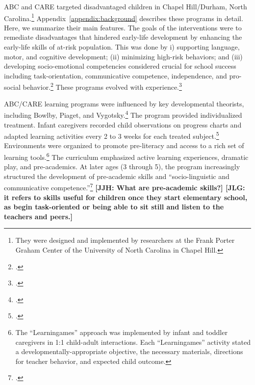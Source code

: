 ABC and CARE targeted disadvantaged children in Chapel Hill/Durham, North Carolina.\footnote{They were designed and implemented by researchers at the Frank Porter Graham Center of the University of North Carolina in Chapel Hill.} Appendix~\ref{appendix:background} describes these programs in detail. Here, we summarize their main features. The goals of the interventions were to remediate disadvantages that hindered early-life development by enhancing the early-life skills of at-risk population. This was done by i) supporting language, motor, and cognitive development; (ii) minimizing high-risk behaviors; and (iii) developing socio-emotional competencies considered crucial for school success including task-orientation, communicative competence, independence, and pro-social behavior.\footnote{\citet{Ramey_Collier_etal_1976_CarolinaAbecedarianProject, Ramey_etal_1985_Project-CARE_TiECSE, Sparling_1974_Synth_Edu_Infant_SPEECH, Wasik_Ramey_etal_1990_CD, Ramey-etal_2012-ABC}.} These programs evolved with experience.\footnote{ \citet{Ramey-etal_1975_AJoMD, Finkelstein_1982_Day_Care_YC, McGinness_1982_Language-Poverty-Child,Haskins_1985_CD}.}

ABC/CARE learning programs were influenced by key developmental theorists, including Bowlby, Piaget, and Vygotsky.\footnote{\citet{Sparling_1974_Synth_Edu_Infant_SPEECH,Mcginness_1981_Developing,abc2014-2015interviews}.} The program provided individualized treatment. Infant caregivers recorded child observations on progress charts and adapted learning activities every 2 to 3 weeks for each treated subject.\footnote{\citet{Ramey_Collier_etal_1976_CarolinaAbecedarianProject,Campbell_Ramey_1994_CD}.} Environments were organized to promote pre-literacy and access to a rich set of learning tools.\footnote{The ``Learningames'' approach was implemented by infant and toddler caregivers in 1:1 child-adult interactions. Each ``Learningames'' activity stated a developmentally-appropriate objective, the necessary materials, directions for teacher behavior, and expected child outcome.} The curriculum emphasized active learning experiences, dramatic play, and pre-academics. At later ages (3 through 5), the program increasingly structured the development of pre-academic skills and ``socio-linguistic and communicative competence.''\footnote{\citet{Ramey-et-al_1977_Intro-to-ABC, Haskins_1985_CD, Ramey_1981_Modification, Ramey_Campbell_1979_SR, Ramey_Smith_1977_AJMD, Ramey_McGinness_etal_1982_Abecedarianapproach, Sparling_Lewis_1979_BOOKLearninggamesFirstThree,Sparling_Lewis_1984_BOOKLearningGamesThreesFours}.} \textbf{[JJH: What are pre-academic skills?] [JLG: it refers to skills useful for children once they start elementary school, as begin task-oriented or being able to sit still and listen to the teachers and peers.]}

